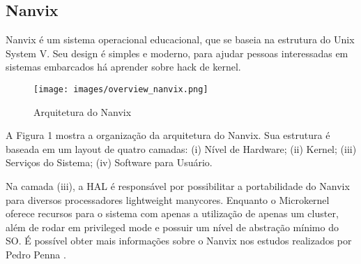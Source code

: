 \subsection{Nanvix}

Nanvix é um sistema operacional educacional, que se baseia na estrutura do Unix System V. Seu design é simples e moderno, 
para ajudar pessoas interessadas em sistemas embarcados há aprender sobre hack de kernel. 

\begin{figure}[h!]
    \centering
    \texttt{[image: images/overview\_nanvix.png]}
    \caption{Arquitetura do Nanvix \\ \cite{penna:tel-03545212}}
\end{figure}

A Figura 1 mostra a organização da arquitetura do Nanvix. Sua estrutura é baseada em um layout de quatro camadas: (i) Nível de Hardware; (ii) Kernel; 
(iii) Serviços do Sistema;  (iv) Software para Usuário.

Na camada (iii), a HAL é responsável por possibilitar a portabilidade do Nanvix para diversos processadores lightweight manycores. Enquanto o Microkernel 
oferece recursos para o sistema com apenas a utilização de apenas um cluster, além de rodar em privileged mode e possuir um nível de abstração mínimo do SO. 
É possível obter mais informações sobre o Nanvix nos estudos realizados por Pedro Penna \cite{penna:tel-03545212}.
